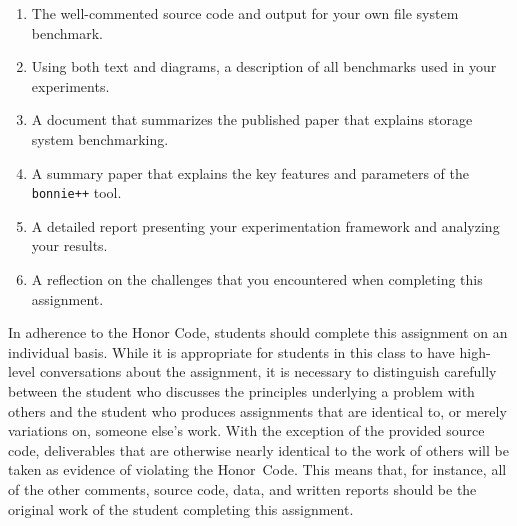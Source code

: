 \vspace*{-.1in}

\begin{enumerate}
  \itemsep 0em

  \item The well-commented source code and output for your own file system benchmark.

  \item Using both text and diagrams, a description of all benchmarks used in your experiments.

  \item A document that summarizes the published paper that explains storage system benchmarking.

  \item A summary paper that explains the key features and parameters of the {\tt bonnie++} tool.

  \item A detailed report presenting your experimentation framework and analyzing your results.

  \item A reflection on the challenges that you encountered when completing this assignment.

\end{enumerate}

\vspace*{-.1in}


In adherence to the Honor Code, students should complete this assignment on an individual basis. While it is appropriate
for students in this class to have high-level conversations about the assignment, it is necessary to distinguish
carefully between the student who discusses the principles underlying a problem with others and the student who produces
assignments that are identical to, or merely variations on, someone else's work.  With the exception of the provided
source code, deliverables that are otherwise nearly identical to the work of others will be taken as evidence of
violating the \mbox{Honor Code}. This means that, for instance, all of the other comments, source code, data, and
written reports should be the original work of the student completing this assignment.




